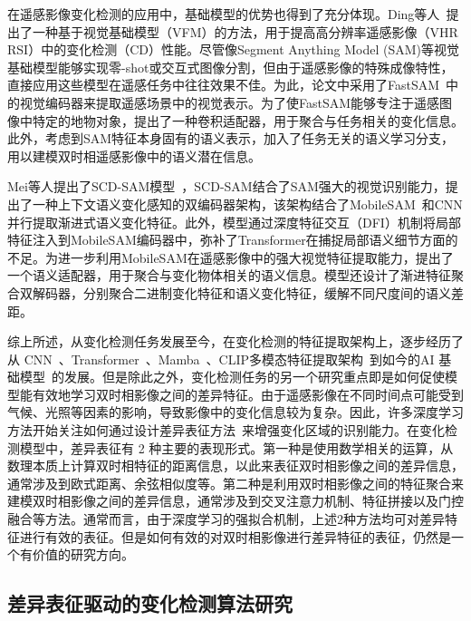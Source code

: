 在遥感影像变化检测的应用中，基础模型的优势也得到了充分体现。Ding等人~\cite{Ding2023AdaptingSA}提出了一种基于视觉基础模型（VFM）的方法，用于提高高分辨率遥感影像（VHR RSI）中的变化检测（CD）性能。尽管像Segment Anything Model (SAM)等视觉基础模型能够实现零-shot或交互式图像分割，但由于遥感影像的特殊成像特性，直接应用这些模型在遥感任务中往往效果不佳。为此，论文中采用了FastSAM~\cite{Zhao2023FastSA}中的视觉编码器来提取遥感场景中的视觉表示。为了使FastSAM能够专注于遥感图像中特定的地物对象，提出了一种卷积适配器，用于聚合与任务相关的变化信息。此外，考虑到SAM特征本身固有的语义表示，加入了任务无关的语义学习分支，用以建模双时相遥感影像中的语义潜在信息。

Mei等人提出了SCD-SAM模型~\cite{Mei2024SCDSAMAS}，SCD-SAM结合了SAM强大的视觉识别能力，提出了一种上下文语义变化感知的双编码器架构，该架构结合了MobileSAM~\cite{Zhang2023FasterSA}和CNN并行提取渐进式语义变化特征。此外，模型通过深度特征交互（DFI）机制将局部特征注入到MobileSAM编码器中，弥补了Transformer在捕捉局部语义细节方面的不足。为进一步利用MobileSAM在遥感影像中的强大视觉特征提取能力，提出了一个语义适配器，用于聚合与变化物体相关的语义信息。模型还设计了渐进特征聚合双解码器，分别聚合二进制变化特征和语义变化特征，缓解不同尺度间的语义差距。


综上所述，从变化检测任务发展至今，在变化检测的特征提取架构上，逐步经历了从 CNN~\cite{He2015DeepRL}、Transformer~\cite{Vaswani2017AttentionIA}、Mamba~\cite{Zhu2024VisionME}、CLIP多模态特征提取架构~\cite{Radford2021LearningTV}到如今的AI 基础模型~\cite{Kirillov2023SegmentA,Caron2021EmergingPI,simeoni2025dinov3}的发展。但是除此之外，变化检测任务的另一个研究重点即是如何促使模型能有效地学习双时相影像之间的差异特征。由于遥感影像在不同时间点可能受到气候、光照等因素的影响，导致影像中的变化信息较为复杂。因此，许多深度学习方法开始关注如何通过设计差异表征方法~\cite{shi_deeply_2022}来增强变化区域的识别能力。在变化检测模型中，差异表征有 2 种主要的表现形式。第一种是使用数学相关的运算，从数理本质上计算双时相特征的距离信息，以此来表征双时相影像之间的差异信息，通常涉及到欧式距离、余弦相似度等。第二种是利用双时相影像之间的特征聚合来建模双时相影像之间的差异信息，通常涉及到交叉注意力机制、特征拼接以及门控融合等方法。通常而言，由于深度学习的强拟合机制，上述2种方法均可对差异特征进行有效的表征。但是如何有效的对双时相影像进行差异特征的表征，仍然是一个有价值的研究方向。

\subsection{差异表征驱动的变化检测算法研究}

